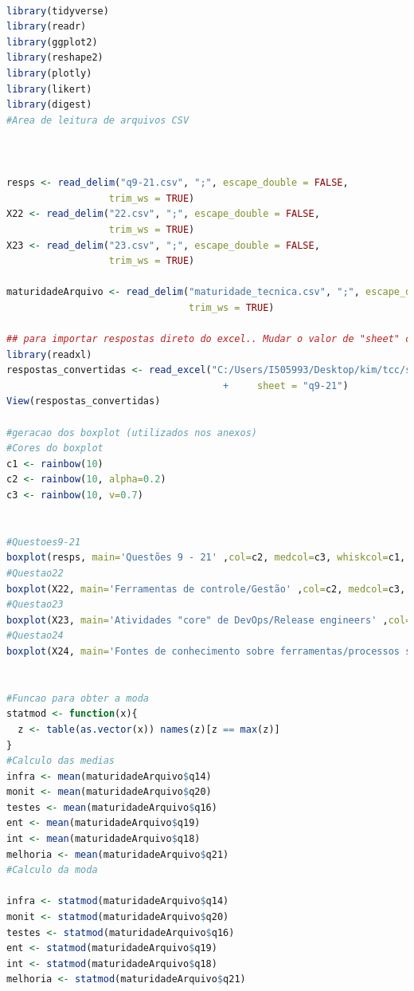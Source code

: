 \documentclass[twoside,english,brazilian]{UNISINOSartigo}
\begin{document}
\footnotesize{
\begin{lstlisting}[language=r]

library(tidyverse)
library(readr)
library(ggplot2)
library(reshape2)
library(plotly)
library(likert)
library(digest)
#Area de leitura de arquivos CSV



resps <- read_delim("q9-21.csv", ";", escape_double = FALSE, 
                  trim_ws = TRUE)
X22 <- read_delim("22.csv", ";", escape_double = FALSE, 
                  trim_ws = TRUE)
X23 <- read_delim("23.csv", ";", escape_double = FALSE, 
                  trim_ws = TRUE)

maturidadeArquivo <- read_delim("maturidade_tecnica.csv", ";", escape_double = FALSE, 
                                trim_ws = TRUE)

## para importar respostas direto do excel.. Mudar o valor de "sheet" conforme a aba desejada.
library(readxl)
respostas_convertidas <- read_excel("C:/Users/I505993/Desktop/kim/tcc/survey/respostas_convertidas.xlsx", 
                                      +     sheet = "q9-21")
View(respostas_convertidas)

#geracao dos boxplot (utilizados nos anexos)
#Cores do boxplot
c1 <- rainbow(10)
c2 <- rainbow(10, alpha=0.2)
c3 <- rainbow(10, v=0.7)


#Questoes9-21
boxplot(resps, main='Questões 9 - 21' ,col=c2, medcol=c3, whiskcol=c1, staplecol=c3, boxcol=c3, outcol=c3, pch=23, cex=2)
#Questao22
boxplot(X22, main='Ferramentas de controle/Gestão' ,col=c2, medcol=c3, whiskcol=c1, staplecol=c3, boxcol=c3, outcol=c3, pch=23, cex=2)
#Questao23
boxplot(X23, main='Atividades "core" de DevOps/Release engineers' ,col=c2, medcol=c3, whiskcol=c1, staplecol=c3, boxcol=c3, outcol=c3, pch=23, cex=2, las=2, par(mar = c(12, 5, 4, 2)+ 0.1)) \\
#Questao24
boxplot(X24, main='Fontes de conhecimento sobre ferramentas/processos sobre DevOps' ,col=c2, medcol=c3, whiskcol=c1, staplecol=c3, boxcol=c3, outcol=c3, pch=23, cex=2)


#Funcao para obter a moda
statmod <- function(x){
  z <- table(as.vector(x)) names(z)[z == max(z)]
}
#Calculo das medias
infra <- mean(maturidadeArquivo$q14)
monit <- mean(maturidadeArquivo$q20)
testes <- mean(maturidadeArquivo$q16)
ent <- mean(maturidadeArquivo$q19)
int <- mean(maturidadeArquivo$q18)
melhoria <- mean(maturidadeArquivo$q21)
#Calculo da moda

infra <- statmod(maturidadeArquivo$q14)
monit <- statmod(maturidadeArquivo$q20)
testes <- statmod(maturidadeArquivo$q16)
ent <- statmod(maturidadeArquivo$q19)
int <- statmod(maturidadeArquivo$q18)
melhoria <- statmod(maturidadeArquivo$q21)




\end{lstlisting}}
\end{document}

